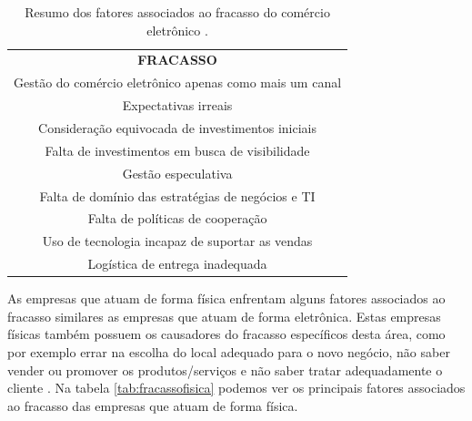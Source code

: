 \begin{table}[h]
 \centering
 {\renewcommand\arraystretch{1.25}
 
  \caption{Resumo dos fatores associados ao fracasso do comércio eletrônico \cite{rosanasantarosa2016}. }
 \label{tab:fracasso}
 
 \begin{tabular}{ l }
  \cline{1-1}  
    \multicolumn{1}{|c|}{\textbf{FRACASSO} \centering }
  \\  
  \cline{1-1}  
    \multicolumn{1}{|c|}{Gestão do comércio eletrônico apenas como mais um canal \centering }
  \\  
  \cline{1-1}  
    \multicolumn{1}{|c|}{Expectativas irreais \centering }
  \\  
  \cline{1-1}  
    \multicolumn{1}{|c|}{Consideração equivocada de investimentos iniciais \centering }
  \\  
  \cline{1-1}  
    \multicolumn{1}{|c|}{Falta de investimentos em busca de visibilidade \centering }
  \\  
  \cline{1-1}  
    \multicolumn{1}{|c|}{Gestão especulativa \centering }
  \\  
  \cline{1-1}  
    \multicolumn{1}{|c|}{Falta de domínio das estratégias de negócios e TI \centering }
  \\  
  \cline{1-1}  
    \multicolumn{1}{|c|}{Falta de políticas de cooperação \centering }
  \\  
  \cline{1-1}  
    \multicolumn{1}{|c|}{Uso de tecnologia incapaz de suportar as vendas \centering }
  \\  
  \cline{1-1}  
    \multicolumn{1}{|c|}{Logística de entrega inadequada \centering }
  \\  
  \hline

 \end{tabular} }
\end{table}

As empresas que atuam de forma física enfrentam alguns fatores associados ao fracasso similares as empresas que atuam de forma eletrônica. Estas empresas físicas também possuem os causadores do fracasso específicos desta área, como por exemplo errar na escolha do local adequado para o novo negócio, não saber vender ou promover os produtos/serviços e não saber tratar adequadamente o cliente \cite{idalbertochiavenato2007}. Na tabela \ref{tab:fracassofisica} podemos ver os principais fatores associados ao fracasso das empresas que atuam de forma física.

